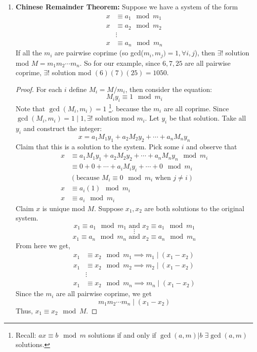 \documentclass[class=article, crop=false]{standalone}
\begin{document}
\begin{enumerate}[1.]
	\item \textbf{Chinese Remainder Theorem:}
	Suppose we have a system of the form
	\begin{align*}
		x &\equiv a_1\mod m_1 \\
		x &\equiv a_2\mod m_2 \\
		&\vdots \\
		x &\equiv a_n\mod m_n
	\end{align*}
	If all the $m_i$ are pairwise coprime (so gcd($m_i, m_j)=1, \forall i, j$), then
	$\exists !$ solution mod $M=m_1 m_2\cdots m_n$. So for our example, since 
	$6,7,25$ are all pairwise coprime, $\exists!$ solution mod $(6)(7)(25)=1050$.
	\begin{proof}
		For each $i$ define $M_i = M/m_i$, then consider the equation:
		$$M_i y_i \equiv 1\mod m_i$$
		Note that $\gcd (M_i, m_i)=1$
		\footnote{Recall: $ax\equiv b\mod m$ solutions if and only if $\gcd(a,m)|b$
		$\exists\gcd(a,m)$ solutions.}. because the $m_i$ are all coprime.
		Since $\gcd(M_i, m_i)=1\mid 1, \exists!$ solution mod $m_i$. Let $y_i$ be that solution.
		Take all $y_i$ and construct the integer:
		$$x=a_1M_1y_1 + a_2M_2y_2+ \cdots + a_nM_ny_n$$
		Claim that this is a solution to the system. Pick some $i$ and observe that
		\begin{align*}
			x &\equiv a_1M_1y_1 + a_2M_2y_2+ \cdots + a_nM_ny_n \mod m_i \\
			&\equiv 0 + 0 +\cdots + a_iM_iy_i + \cdots + 0 \mod m_i \\
			&\left(\text{because } M_i\equiv 0\mod m_i \text{ when } j\neq i\right) \\
			x &\equiv a_i (1) \mod m_i \\
			x &\equiv a_i \mod m_i
		\end{align*}
		Claim $x$ is unique mod $M$. Suppose $x_1, x_2$ are both solutions to the original system.
		$$x_1\equiv a_1\mod m_1\text{ and } x_2\equiv a_1\mod m_1$$
		$$\vdots$$
		$$x_1\equiv a_n\mod m_n\text{ and } x_2\equiv a_n\mod m_n$$
		From here we get,
		\begin{align*}
			x_1 &\equiv x_2\mod m_1 \implies m_1\mid (x_1-x_2) \\
			x_1 &\equiv x_2\mod m_2 \implies m_2\mid (x_1-x_2) \\
			&\vdots \\
			x_1 &\equiv x_2\mod m_n \implies m_n\mid (x_1-x_2)
		\end{align*}
		Since the $m_i$ are all pairwise coprime, we get
		$$m_1 m_2\cdots m_n \mid (x_1 - x_2)$$
		Thus, $x_1\equiv x_2\mod M$.
	\end{proof}


\end{enumerate}
\end{document}
